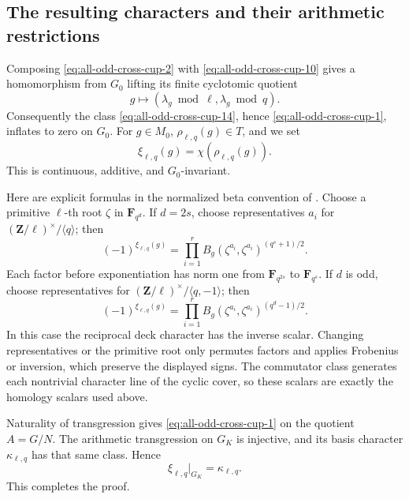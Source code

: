 \subsection{The resulting characters and their arithmetic restrictions}

Composing \eqref{eq:all-odd-cross-cup-2} with \eqref{eq:all-odd-cross-cup-10} gives a homomorphism from
\(G_0\) lifting its finite cyclotomic quotient
\[
       g\longmapsto
        (\lambda_g\bmod\ell,\lambda_g\bmod q).
\]
Consequently the class \eqref{eq:all-odd-cross-cup-14}, hence \eqref{eq:all-odd-cross-cup-1}, inflates to
zero on \(G_0\).
For \(g\in M_0\), \(\rho_{\ell,q}(g)\in T\), and we set
\[
                       \xi_{\ell,q}(g)=
                                  \chi(\rho_{\ell,q}(g)).
\]
This is continuous, additive, and \(G_0\)-invariant.

Here are explicit formulas in the normalized beta
convention of \cite[\S2.3, p.~101]{Furusho2003}.
Choose a primitive \(\ell\)-th root \(\zeta\) in
\(\mathbf F_{q^d}\).
If \(d=2s\), choose representatives \(a_i\) for
\((\mathbf Z/\ell)^\times/\langle q\rangle\); then
\begin{equation}
 (-1)^{\xi_{\ell,q}(g)}
   =\prod_{i=1}^{r}
       B_g(\zeta^{a_i},\zeta^{a_i})^{(q^s+1)/2}.            \label{eq:all-odd-cross-cup-16}
\end{equation}
Each factor before exponentiation has norm one from
\(\mathbf F_{q^{2s}}\) to \(\mathbf F_{q^s}\).
If \(d\) is odd, choose representatives for
\((\mathbf Z/\ell)^\times/\langle q,-1\rangle\); then
\begin{equation}
 (-1)^{\xi_{\ell,q}(g)}
   =\prod_{i=1}^{r}
       B_g(\zeta^{a_i},\zeta^{a_i})^{(q^d-1)/2}.            \label{eq:all-odd-cross-cup-17}
\end{equation}
In this case the reciprocal deck character has the
inverse scalar.
Changing representatives or the primitive root only
permutes factors and applies Frobenius or inversion,
which preserve the displayed signs.
The commutator class generates each nontrivial
character line of the cyclic cover, so these scalars
are exactly the homology scalars used above.

Naturality of transgression gives \eqref{eq:all-odd-cross-cup-1} on the quotient
\(A=G/N\).
The arithmetic transgression on \(G_K\) is injective,
and its basis character \(\kappa_{\ell,q}\) has that
same class. Hence
\[
                       \xi_{\ell,q}|_{G_K}=\kappa_{\ell,q}.
\]
This completes the proof.

